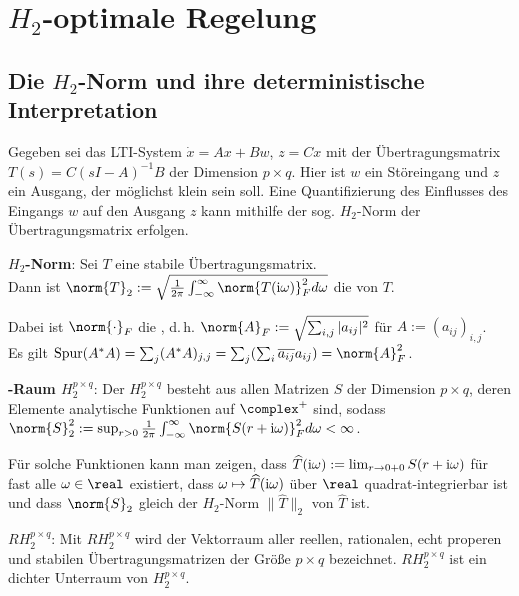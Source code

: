 \section{%
    \texorpdfstring{$H_2$-optimale}{H₂-optimale} Regelung%
}

\subsection{%
    Die \texorpdfstring{$H_2$-Norm}{H₂-Norm} und ihre deterministische Interpretation%
}

Gegeben sei das LTI-System $\dot{x} = Ax + Bw$, $z = Cx$ mit
der Übertragungsmatrix\\
$T(s) = C(sI - A)^{-1}B$ der Dimension $p \times q$.
Hier ist $w$ ein Störeingang und $z$ ein Ausgang, der möglichst klein sein soll.
Eine Quantifizierung des Einflusses des Eingangs $w$ auf den Ausgang $z$ kann mithilfe der sog.
$H_2$-Norm der Übertragungsmatrix erfolgen.

\textbf{$H_2$-Norm}:
Sei $T$ eine stabile Übertragungsmatrix.\\
Dann ist
$\norm{T}_2 := \sqrt{\frac{1}{2\pi} \int_{-\infty}^\infty \norm{T(\iu\omega)}_F^2 d\omega}$
die  von $T$.

Dabei ist $\norm{\cdot}_F$ die , d.\,h.
$\norm{A}_F := \sqrt{\sum_{i,j} |a_{ij}|^2}$ für $A := (a_{ij})_{i,j}$.\\
Es gilt $\Spur(A^\ast A)
= \sum_j (A^\ast A)_{j,j}
= \sum_j (\sum_i \overline{a_{ij}} a_{ij})
= \norm{A}_F^2$.

\linie

\textbf{-Raum $H_2^{p \times q}$}:
Der  $H_2^{p \times q}$ besteht aus
allen Matrizen $S$ der Dimension $p \times q$,
deren Elemente analytische Funktionen auf $\complex^+$ sind, sodass\\
$\norm{S}_2^2 := \sup_{r > 0} \frac{1}{2\pi} \int_{-\infty}^\infty \norm{S(r + \iu\omega)}_F^2
d\omega < \infty$.

Für solche Funktionen kann man zeigen, dass
$\widehat{T}(\text{i}\omega) := \lim_{r \to 0+0} S(r + \text{i}\omega)$
für fast alle $\omega \in \real$ existiert,
dass $\omega \mapsto \widehat{T}(\text{i}\omega)$ über $\real$ quadrat-integrierbar ist und
dass $\norm{S}_2$ gleich der $H_2$-Norm $\lVert\widehat{T}\rVert_2$ von $\widehat{T}$ ist.

\textbf{$RH_2^{p \times q}$}:
Mit $RH_2^{p \times q}$ wird der Vektorraum aller reellen, rationalen, echt properen und stabilen
Übertragungsmatrizen der Größe $p \times q$ bezeichnet.
$RH_2^{p \times q}$ ist ein dichter Unterraum von $H_2^{p \times q}$.


